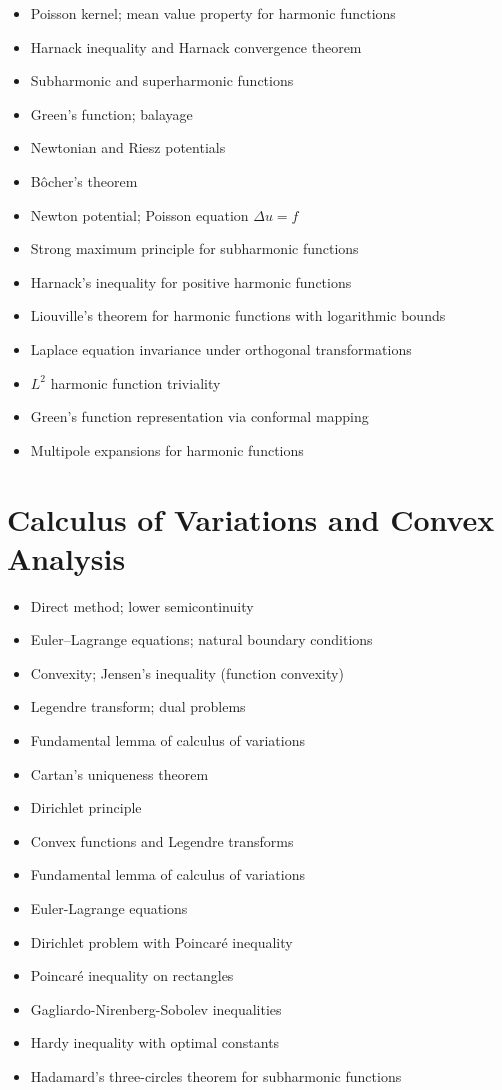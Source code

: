 \documentclass{amsart}
\begin{document}
\begin{itemize}
  \item Poisson kernel; mean value property for harmonic functions
  \item Harnack inequality and Harnack convergence theorem
  \item Subharmonic and superharmonic functions
  \item Green's function; balayage
  \item Newtonian and Riesz potentials
  \item B\^ocher's theorem
  \item Newton potential; Poisson equation $\Delta u = f$
  \item Strong maximum principle for subharmonic functions
  \item Harnack's inequality for positive harmonic functions
  \item Liouville's theorem for harmonic functions with logarithmic bounds
  \item Laplace equation invariance under orthogonal transformations
  \item $L^2$ harmonic function triviality
  \item Green's function representation via conformal mapping
  \item Multipole expansions for harmonic functions
\end{itemize}

\section{Calculus of Variations and Convex Analysis}

\begin{itemize}
  \item Direct method; lower semicontinuity
  \item Euler--Lagrange equations; natural boundary conditions
  \item Convexity; Jensen's inequality (function convexity)
  \item Legendre transform; dual problems
  \item Fundamental lemma of calculus of variations
  \item Cartan's uniqueness theorem
  \item Dirichlet principle
  \item Convex functions and Legendre transforms
  \item Fundamental lemma of calculus of variations
  \item Euler-Lagrange equations
  \item Dirichlet problem with Poincar\'e inequality
  \item Poincar\'e inequality on rectangles
  \item Gagliardo-Nirenberg-Sobolev inequalities
  \item Hardy inequality with optimal constants
  \item Hadamard's three-circles theorem for subharmonic functions
\end{itemize}
\end{document}
